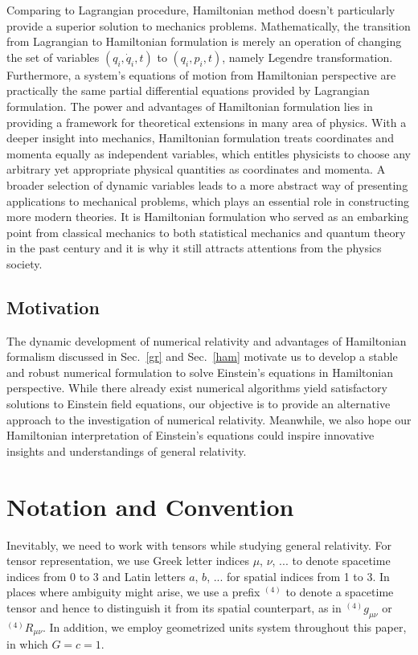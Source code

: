 Comparing to Lagrangian procedure, Hamiltonian method doesn't particularly provide a superior solution to mechanics problems. Mathematically, the transition from Lagrangian to Hamiltonian formulation is merely an operation of changing the set of variables $(q_{i}, {\dot q}_{i}, t)$ to $(q_{i}, p_{i}, t)$, namely Legendre transformation. Furthermore, a system's equations of motion from Hamiltonian perspective are practically the same partial differential equations provided by Lagrangian formulation. The power and advantages of Hamiltonian formulation lies in providing a framework for theoretical extensions in many area of physics. With a deeper insight into mechanics, Hamiltonian formulation treats coordinates and momenta equally as independent variables, which entitles physicists to choose any arbitrary yet appropriate physical quantities as coordinates and momenta. A broader selection of dynamic variables leads to a more abstract way of presenting applications to mechanical problems, which plays an essential role in constructing more modern theories. It is Hamiltonian formulation who served as an embarking point from classical mechanics to both statistical mechanics and quantum theory in the past century and it is why it still attracts attentions from the physics society\cite{goldstein}. 
\subsection{Motivation}
The dynamic development of numerical relativity and advantages of Hamiltonian formalism discussed in Sec.~\ref{gr} and Sec.~\ref{ham} motivate us to develop a stable and robust numerical formulation to solve Einstein's equations in Hamiltonian perspective. While there already exist numerical algorithms yield satisfactory solutions to Einstein field equations, our objective is to provide an alternative approach to the investigation of numerical relativity. Meanwhile, we also hope our Hamiltonian interpretation of Einstein's equations could inspire innovative insights and understandings of general relativity. 
\section{Notation and Convention}\label{notation}
Inevitably, we need to work with tensors while studying general relativity. For tensor representation, we use Greek letter indices $\mu$, $\nu$, ... to denote spacetime indices from 0 to 3 and Latin letters $a$, $b$, ... for spatial indices from 1 to 3. In places where ambiguity might arise, we use a prefix $^{(4)}$ to denote a spacetime tensor and hence to distinguish it from its spatial counterpart, as in $^{(4)}g_{\mu\nu}$ or $^{(4)}R_{\mu\nu}$. In addition, we employ geometrized  units system throughout this paper, in which $G = c = 1$.

